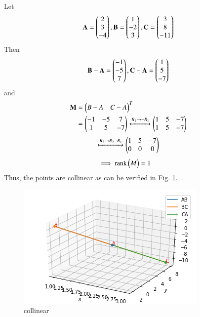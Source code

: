 Let
\begin{align}
\vec{A} = \myvec{2 \\ 3 \\ -4} , \Vec{B} = \myvec{1 \\ -2 \\3} , \Vec{C} = \myvec{3 \\ 8 \\ -11}
\end{align}
Then
\begin{align}
\mathbf{B-A}= \begin{pmatrix}-1\\-5\\7\end{pmatrix},
\mathbf{C-A}=\begin{pmatrix}1\\5\\-7\end{pmatrix}
\end{align}
and 
\begin{align}
\mathbf{M} &= \mathbf{\begin{pmatrix}B-A  & C-A\end{pmatrix}}^T
\\
 &= \begin{pmatrix}-1 & -5 & 7\\1 & 5 & -7\end{pmatrix} 
\xleftrightarrow {R_1\rightarrow -R_1}\begin{pmatrix}1 & 5 & -7 \\1 & 5 & -7\end{pmatrix}
\end{align}
\begin{align}
\xleftrightarrow{R_2\rightarrow R_2-R_1}\begin{pmatrix}1 & 5 & -7 \\0 & 0 & 0\end{pmatrix}
\end{align}
\begin{align}
\implies \text{rank} \begin{pmatrix}M\end{pmatrix} &=1
\end{align}
Thus, the points are collinear as can be verified in Fig. \ref{vec/2/24fig: collinear}.
\begin{figure}[!ht]
\centering
\includegraphics[width=\columnwidth]{solutions/su2021/2/24/figure.png}
\caption{collinear}
\label{vec/2/24fig: collinear}	
\end{figure}
